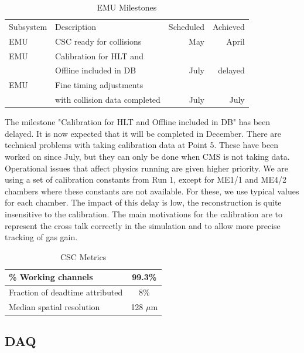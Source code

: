 \begin{table}[htp]
\caption{EMU Milestones}
\begin{center}
\begin{tabular}{|l|l|r|r|}
\hline
Subsystem&Description&Scheduled&Achieved\\
EMU& CSC ready for collisions& May & April \\
\hline
EMU& Calibration for HLT and & &\\
& Offline included in DB & July & delayed\\
\hline
EMU & Fine timing adjustments & & \\
&with collision data completed & July &July \\
\hline
\end{tabular}
\end{center}
\label{EMUMilestones}
\end{table}%

The milestone "Calibration for HLT and Offline included in DB" has been delayed.  It is now expected that it will be completed in December. There are technical problems with taking calibration data at Point 5. These have been worked on since July, but they can only be done when CMS is not taking
data. Operational issues that affect physics running are given higher priority. We are using a set of calibration constants from Run 1, except for ME1/1 and
ME4/2 chambers where these constants are not available. For these, we use
typical values for each chamber.  The impact of this delay is low, the reconstruction is quite insensitive 
to the calibration.  The main motivations for the calibration are to represent the cross talk
correctly in the simulation and to allow more precise tracking of gas gain.

\begin{table}[htp]
\caption{CSC Metrics}
\begin{center}
\begin{tabular}{|l|c|}
\hline
 \% Working channels & 99.3\%  \\
\hline
Fraction of deadtime attributed& 8\%\\
\hline
Median spatial resolution & 128 $\mu$m\\
\hline
\end{tabular}
\end{center}
\label{TrackerMetrics}
\end{table}%

\subsection{DAQ}

